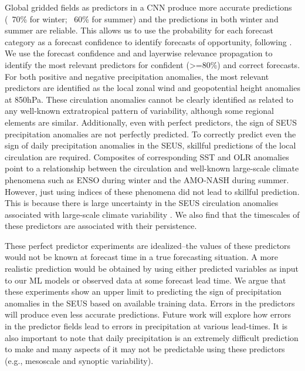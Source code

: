 \documentclass{ametsocV6.1}
\begin{document}
Global gridded fields as predictors in a CNN produce more accurate predictions (~70\% for winter; ~60\% for summer) and the predictions in both winter and summer are reliable. This allows us to use the probability for each forecast category as a forecast confidence to identify forecasts of opportunity, following \cite{mayer_subseasonal_2021}.  We use the forecast confidence and and layerwise relevance propagation to identify the most relevant predictors for confident (>=80\%) and correct forecasts.  For both positive and negative precipitation anomalies, the most relevant predictors are identified as the local zonal wind and geopotential height anomalies at 850hPa.  These circulation anomalies cannot be clearly identified as related to any well-known extratropical pattern of variability, although some regional elements are similar.  Additionally, even with perfect predictors, the sign of SEUS precipitation anomalies are not perfectly predicted.  To correctly predict even the sign of daily precipitation anomalies in the SEUS, skillful predictions of the local circulation are required.  Composites of corresponding SST and OLR anomalies point to a relationship between the circulation and well-known large-scale climate phenomena such as ENSO during winter and the AMO-NASH during summer.  However, just using indices of these phenomena did not lead to skillful prediction.  This is because there is large uncertainty in the SEUS circulation anomalies associated with large-scale climate variability \citep[e.g.,][]{deser_how_2018}.  We also find that the timescales of these predictors are associated with their persistence.

These perfect predictor experiments are idealized--the values of these predictors would not be known at forecast time in a true forecasting situation.  A more realistic prediction would be obtained by using either predicted variables as input to our ML models or observed data at some forecast lead time.  We argue that these experiments show an upper limit to predicting the sign of precipitation anomalies in the SEUS based on available training data.  Errors in the predictors will produce even less accurate predictions.  Future work will explore how errors in the predictor fields lead to errors in precipitation at various lead-times.  It is also important to note that daily precipitation is an extremely difficult prediction to make and many aspects of it may not be predictable using these predictors (e.g., mesoscale and synoptic variability).  
\end{document}
